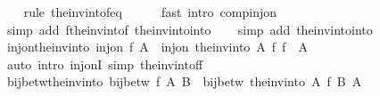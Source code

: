 \begin{isabellebody}
%
\isadelimproof
\ \ %
\endisadelimproof
%
\isatagproof
{}\isamarkupfalse%
\ {\isacharparenleft}{\kern0pt}rule\ the{\isacharunderscore}{\kern0pt}inv{\isacharunderscore}{\kern0pt}into{\isacharunderscore}{\kern0pt}f{\isacharunderscore}{\kern0pt}eq{\isacharparenright}{\kern0pt}\isanewline
\ \ \ \ \isamarkupfalse%
\ {\isacharparenleft}{\kern0pt}fast\ intro{\isacharcolon}{\kern0pt}\ comp{\isacharunderscore}{\kern0pt}inj{\isacharunderscore}{\kern0pt}on{\isacharparenright}{\kern0pt}\isanewline
\ \ \ \isamarkupfalse%
\ {\isacharparenleft}{\kern0pt}simp\ add{\isacharcolon}{\kern0pt}\ f{\isacharunderscore}{\kern0pt}the{\isacharunderscore}{\kern0pt}inv{\isacharunderscore}{\kern0pt}into{\isacharunderscore}{\kern0pt}f\ the{\isacharunderscore}{\kern0pt}inv{\isacharunderscore}{\kern0pt}into{\isacharunderscore}{\kern0pt}into{\isacharparenright}{\kern0pt}\isanewline
\ \ \isamarkupfalse%
\ {\isacharparenleft}{\kern0pt}simp\ add{\isacharcolon}{\kern0pt}\ the{\isacharunderscore}{\kern0pt}inv{\isacharunderscore}{\kern0pt}into{\isacharunderscore}{\kern0pt}into{\isacharparenright}{\kern0pt}\isanewline
\ \ \isamarkupfalse%
%
\endisatagproof
{\isafoldproof}%
%
\isadelimproof
\isanewline
%
\endisadelimproof
\isanewline
{}\isamarkupfalse%
\ inj{\isacharunderscore}{\kern0pt}on{\isacharunderscore}{\kern0pt}the{\isacharunderscore}{\kern0pt}inv{\isacharunderscore}{\kern0pt}into{\isacharcolon}{\kern0pt}\ {\isachardoublequoteopen}inj{\isacharunderscore}{\kern0pt}on\ f\ A\ {\isasymLongrightarrow}\ inj{\isacharunderscore}{\kern0pt}on\ {\isacharparenleft}{\kern0pt}the{\isacharunderscore}{\kern0pt}inv{\isacharunderscore}{\kern0pt}into\ A\ f{\isacharparenright}{\kern0pt}\ {\isacharparenleft}{\kern0pt}f\ {\isacharbackquote}{\kern0pt}\ A{\isacharparenright}{\kern0pt}{\isachardoublequoteclose}\isanewline
%
\isadelimproof
\ \ %
\endisadelimproof
%
\isatagproof
{}\isamarkupfalse%
\ {\isacharparenleft}{\kern0pt}auto\ intro{\isacharcolon}{\kern0pt}\ inj{\isacharunderscore}{\kern0pt}onI\ simp{\isacharcolon}{\kern0pt}\ the{\isacharunderscore}{\kern0pt}inv{\isacharunderscore}{\kern0pt}into{\isacharunderscore}{\kern0pt}f{\isacharunderscore}{\kern0pt}f{\isacharparenright}{\kern0pt}%
\endisatagproof
{\isafoldproof}%
%
\isadelimproof
\isanewline
%
\endisadelimproof
\isanewline
{}\isamarkupfalse%
\ bij{\isacharunderscore}{\kern0pt}betw{\isacharunderscore}{\kern0pt}the{\isacharunderscore}{\kern0pt}inv{\isacharunderscore}{\kern0pt}into{\isacharcolon}{\kern0pt}\ {\isachardoublequoteopen}bij{\isacharunderscore}{\kern0pt}betw\ f\ A\ B\ {\isasymLongrightarrow}\ bij{\isacharunderscore}{\kern0pt}betw\ {\isacharparenleft}{\kern0pt}the{\isacharunderscore}{\kern0pt}inv{\isacharunderscore}{\kern0pt}into\ A\ f{\isacharparenright}{\kern0pt}\ B\ A{\isachardoublequoteclose}\isanewline

\end{isabellebody}
